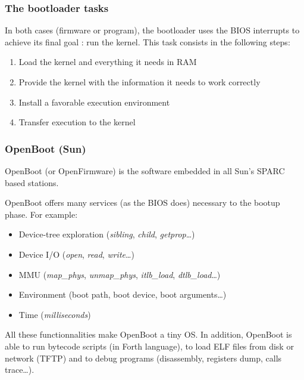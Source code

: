 %
%
%

\begin{frame}
  \frametitle{The bootloader tasks}

  In both cases (firmware or program), the bootloader uses the BIOS interrupts to achieve its final goal : run the kernel. This task consists in the following steps:

  \-

  \begin{enumerate}
  \item Load the kernel and everything it needs in RAM
  \item Provide the kernel with the information it needs to work correctly
  \item Install a favorable execution environment
  \item Transfer execution to the kernel
  \end{enumerate}

\end{frame}

%
%
%

%
%

\begin{frame}
  \frametitle{OpenBoot (Sun)}

  OpenBoot (or OpenFirmware) is the software embedded in all Sun's
  SPARC based stations.

  \-

  OpenBoot offers many services (as the BIOS does) necessary to the
  bootup phase. For example:

  \begin{itemize}
  \item
    Device-tree exploration (\emph{sibling}, \emph{child},
    \emph{getprop}\ldots)
  \item
    Device I/O (\emph{open}, \emph{read}, \emph{write}\ldots)
  \item
    MMU (\emph{map\_phys}, \emph{unmap\_phys}, \emph{itlb\_load},
    \emph{dtlb\_load}\ldots)
  \item
    Environment (boot path, boot device, boot arguments\ldots)
  \item
    Time (\emph{milliseconds})
  \end{itemize}

  \-

  All these functionnalities make OpenBoot a tiny OS. In addition,
  OpenBoot is able to run bytecode scripts (in Forth language), to
  load ELF files from disk or network (TFTP) and to debug programs
  (disassembly, registers dump, calls trace\ldots).

\end{frame}

